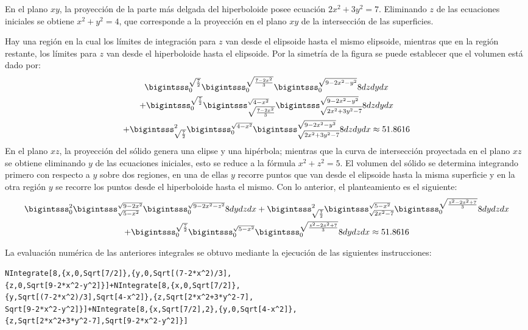 \begin{parrafonumerado}
En el plano $xy$, la proyección de la parte más delgada del hiperboloide posee ecuación $2x^{2}+3y^{2}=7$. Eliminando $z$ de las ecuaciones iniciales se obtiene $x^{2}+y^{2}=4$, que corresponde a la proyección en el plano $xy$ de la intersección de las superficies.

Hay una región en la cual los límites de integración para $z$ van desde el elipsoide hasta el mismo elipsoide, mientras que en la región restante, los límites para $z$ van desde el hiperboloide hasta el elipsoide. Por la simetría de la figura se puede establecer que el volumen está dado por:
\begin{multline}
\bigintsss_{0}^{\sqrt{\frac{7}{2}}}\bigintsss_{0}^{\sqrt{\frac{7-2x^{2}}{3}}}\bigintsss_{0}^{\sqrt{9-2x^{2}-y^{2}}}8dzdydx \\
+ \bigintsss_{0}^{\sqrt{\frac{7}{2}}}\bigintsss_{\sqrt{\frac{7-2x^{2}}{3}}}^{\sqrt{4-x^{2}}}\bigintsss_{\sqrt{2x^{2}+3y^{2}-7}}^{\sqrt{9-2x^{2}-y^{2}}}8dzdydx\\
+\bigintsss_{\sqrt{\frac{7}{2}}}^2 \bigintsss_{0}^{\sqrt{4-x^{2}}}\bigintsss_{\sqrt{2x^{2}+3y^{2}-7}}^{\sqrt{9-2x^{2}-y^{2}}}8dzdydx \approx 51.8616 \label{ejercicio6}
\end{multline}
%
En el plano $xz$, la proyección del sólido genera una elipse y una hipérbola; mientras que la curva de intersección proyectada en el plano $xz$ se obtiene eliminando $y$ de las ecuaciones iniciales, esto se reduce a la fórmula $x^2+z^2=5$. El volumen del sólido se determina integrando primero con respecto a $y$ sobre dos regiones,
en una de ellas $y$ recorre puntos que van desde el elipsoide hasta la misma superficie y en la otra región $y$ se recorre los puntos desde el hiperboloide hasta el mismo. Con lo anterior, el planteamiento es el siguiente:
\begin{gather}
\bigintsss_{0}^2 \bigintsss_{\sqrt{5-x^{2}}}^{\sqrt{9-2x^{2}}}\bigintsss_{0}^{\sqrt{9-2x^{2}-z^{2}}}8dydzdx +
\bigintsss_{\sqrt{\frac{7}{2}}}^2 \bigintsss_{\sqrt{2x^{2}-7}}^{\sqrt{5-x^{2}}}\bigintsss_{0}^{\sqrt{\frac{z^{2}-2x^{2}+7}{3}}}8dydzdx \notag  \\
+\bigintsss_{0}^{\sqrt{\frac{7}{2}}}\bigintsss_{0}^{\sqrt{5-x^{2}}}\bigintsss_{0}^{\sqrt{\frac{z^{2}-2x^{2}+7}{3}}}8dydzdx \approx 51.8616
\end{gather}

La evaluación numérica de las anteriores integrales se obtuvo mediante la
ejecución de las siguientes instrucciones:
%

\begin{tcolorbox}[title=\bf Instrucción en \verb"Mathematica"]\begin{Verbatim}[formatcom=\letraverbatim]
NIntegrate[8,{x,0,Sqrt[7/2]},{y,0,Sqrt[(7-2*x^2)/3],
{z,0,Sqrt[9-2*x^2-y^2]}]+NIntegrate[8,{x,0,Sqrt[7/2]},
{y,Sqrt[(7-2*x^2)/3],Sqrt[4-x^2]},{z,Sqrt[2*x^2+3*y^2-7],
Sqrt[9-2*x^2-y^2]}]+NIntegrate[8,{x,Sqrt[7/2],2},{y,0,Sqrt[4-x^2]},
{z,Sqrt[2*x^2+3*y^2-7],Sqrt[9-2*x^2-y^2]}]
\end{Verbatim}
\end{tcolorbox}


\end{parrafonumerado}

